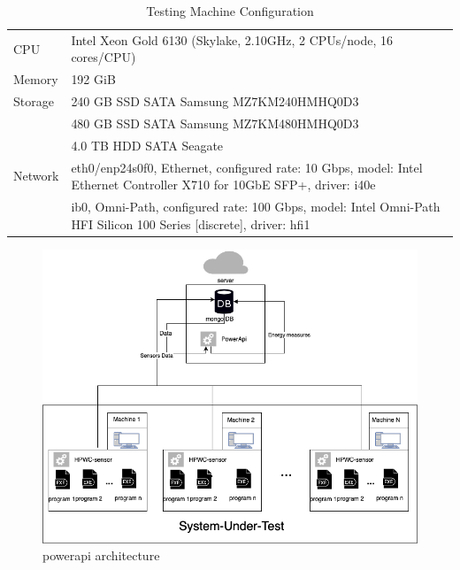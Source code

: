 \begin{table}[hbt]
    \begin{tabular}{ll}
        \hline
        CPU     & Intel Xeon Gold 6130 (Skylake, 2.10GHz, 2 CPUs/node, 16 cores/CPU)                                                     \\
        Memory  & 192 GiB                                                                                                                \\
        Storage & 240 GB SSD SATA Samsung MZ7KM240HMHQ0D3                                                                                \\
                & 480 GB SSD SATA Samsung MZ7KM480HMHQ0D3                                                                                \\
                & 4.0 TB HDD SATA Seagate                                                                                                \\
        Network & eth0/enp24s0f0, Ethernet, configured rate: 10 Gbps, model: Intel Ethernet Controller X710 for 10GbE SFP+, driver: i40e \\
                & ib0, Omni-Path, configured rate: 100 Gbps, model: Intel Omni-Path HFI Silicon 100 Series [discrete], driver: hfi1      \\
        \hline
    \end{tabular}
    \caption{Testing Machine Configuration }
    \label{fig:dahuconfig}
\end{table}

\begin{figure}[hbt]
    \includegraphics[width=\linewidth]{imgs/SmartWatts.png}
    \caption{powerapi architecture}
    \label{fig:powerapi}
\end{figure}

